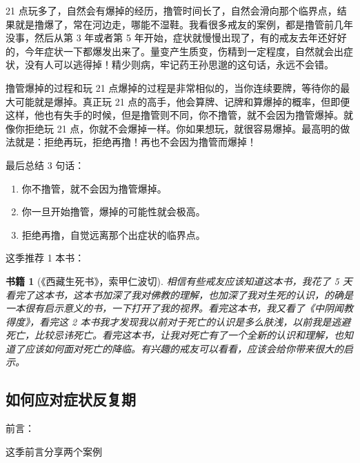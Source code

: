 \documentclass{ctexart}
\newtheorem{book}{书籍}
\begin{document}
21 点玩多了，自然会有爆掉的经历，撸管时间长了，自然会滑向那个临界点，结果就是撸爆了，常在河边走，哪能不湿鞋。我看很多戒友的案例，都是撸管前几年没事，然后从第 3 年或者第 5 年开始，症状就慢慢出现了，有的戒友去年还好好的，今年症状一下都爆发出来了。量变产生质变，伤精到一定程度，自然就会出症状，没有人可以逃得掉！精少则病，牢记药王孙思邈的这句话，永远不会错。

撸管爆掉的过程和玩 21 点爆掉的过程是非常相似的，当你连续要牌，等待你的最大可能就是爆掉。真正玩 21 点的高手，他会算牌、记牌和算爆掉的概率，但即便这样，他也有失手的时候，但是撸管则不同，你不撸管，就不会因为撸管爆掉。就像你拒绝玩 21 点，你就不会爆掉一样。你如果想玩，就很容易爆掉。最高明的做法就是：拒绝再玩，拒绝再撸！再也不会因为撸管而爆掉！

最后总结 3 句话：

\begin{enumerate}
    \item 你不撸管，就不会因为撸管爆掉。
    \item 你一旦开始撸管，爆掉的可能性就会极高。
    \item 拒绝再撸，自觉远离那个出症状的临界点。
\end{enumerate}

这季推荐 1 本书：

\begin{book}[《西藏生死书》，索甲仁波切]
    相信有些戒友应该知道这本书，我花了 5 天看完了这本书，这本书加深了我对佛教的理解，也加深了我对生死的认识，的确是一本很有启示意义的书，一下打开了我的视界。看完这本书，我又看了《中阴闻教得度》，看完这 2 本书我才发现我以前对于死亡的认识是多么肤浅，以前我是逃避死亡，比较忌讳死亡。看完这本书，让我对死亡有了一个全新的认识和理解，也知道了应该如何面对死亡的降临。有兴趣的戒友可以看看，应该会给你带来很大的启示。
\end{book}

\subsection{如何应对症状反复期}

前言：

这季前言分享两个案例
\end{document}
